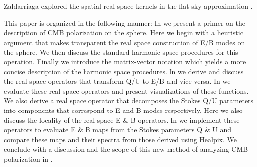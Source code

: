 Zaldarriaga explored the spatial real-space kernels in the flat-sky approximation \citep{Zaldarriaga2001a}.

This paper is organized in the following manner: In  we present a primer on the description of CMB polarization on the sphere. Here we begin with a heuristic argument that makes transparent the real space construction of E/B modes on the sphere. We then discuss the standard harmonic space procedures for this operation. Finally we introduce the matrix-vector notation which yields a more concise description of the harmonic space procedures. In  we derive and discuss the real space operators that transform Q/U to E/B and vice versa. In  we evaluate these real space operators and present visualizations of these functions. We also derive a real space operator that decomposes the Stokes Q/U  parameters into components that correspond to E and B modes respectively.  Here we also discuss the locality of the real space E \& B operators. In  we implement these operators to evaluate E \& B  maps from the Stokes parameters Q \& U and compare these maps and their spectra from those derived using Healpix. We conclude with a discussion and the scope of this new method of analyzing CMB polarization in .
